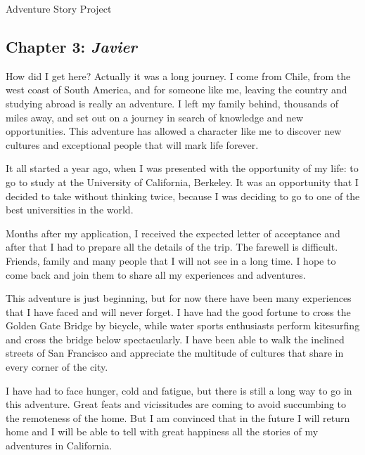 \documentclass{article}
\begin{document}
\Huge Adventure Story Project

\normalsize

\subsection*{Chapter 3: \textit{Javier}}

How did I get here? Actually it was a long journey. I come from Chile, from the west coast of South America, and for someone like me, leaving the country and studying abroad is really an adventure. I left my family behind, thousands of miles away, and set out on a journey in search of knowledge and new opportunities. This adventure has allowed a character like me to discover new cultures and exceptional people that will mark life forever.

It all started a year ago, when I was presented with the opportunity of my life: to go to study at the University of California, Berkeley. It was an opportunity that I decided to take without thinking twice, because I was deciding to go to one of the best universities in the world.

Months after my application, I received the expected letter of acceptance and after that I had to prepare all the details of the trip. The farewell is difficult. Friends, family and many people that I will not see in a long time. I hope to come back and join them to share all my experiences and adventures.

This adventure is just beginning, but for now there have been many experiences that I have faced and will never forget. I have had the good fortune to cross the Golden Gate Bridge by bicycle, while water sports enthusiasts perform kitesurfing and cross the bridge below spectacularly. I have been able to walk the inclined streets of San Francisco and appreciate the multitude of cultures that share in every corner of the city.

I have had to face hunger, cold and fatigue, but there is still a long way to go in this adventure. Great feats and vicissitudes are coming to avoid succumbing to the remoteness of the home. But I am convinced that in the future I will return home and I will be able to tell with great happiness all the stories of my adventures in California.
\end{document}
